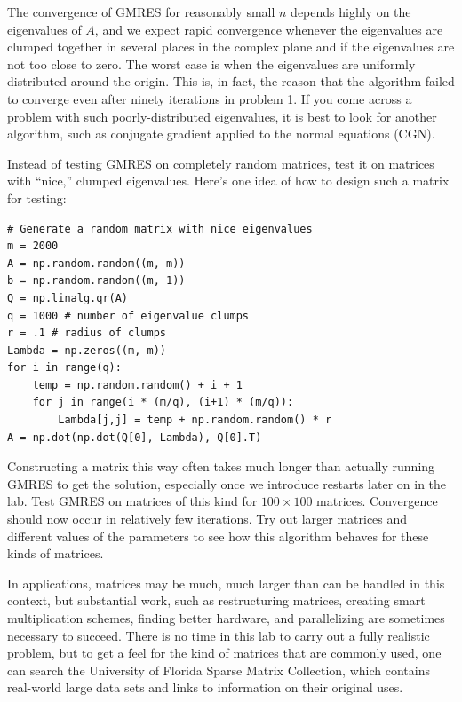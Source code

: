 The convergence of GMRES for reasonably small $n$ depends highly on the eigenvalues of $A$, and we expect rapid convergence whenever the eigenvalues are clumped together in several places in the complex plane and if the eigenvalues are not too close to zero.
The worst case is when the eigenvalues are uniformly distributed around the origin.
This is, in fact, the reason that the algorithm failed to converge even after ninety iterations in problem 1.
If you come across a problem with such poorly-distributed eigenvalues, it is best to look for another algorithm, such as conjugate gradient applied to the normal equations (CGN).

\begin{problem}
\label{prob:GMRESClumps}
Instead of testing GMRES on completely random matrices, test it on matrices with ``nice,'' clumped eigenvalues.
Here's one idea of how to design such a matrix for testing:
\begin{lstlisting}
# Generate a random matrix with nice eigenvalues
m = 2000
A = np.random.random((m, m))
b = np.random.random((m, 1))
Q = np.linalg.qr(A)
q = 1000 # number of eigenvalue clumps
r = .1 # radius of clumps
Lambda = np.zeros((m, m))
for i in range(q):
    temp = np.random.random() + i + 1
    for j in range(i * (m/q), (i+1) * (m/q)):
        Lambda[j,j] = temp + np.random.random() * r
A = np.dot(np.dot(Q[0], Lambda), Q[0].T)
\end{lstlisting}
Constructing a matrix this way often takes much longer than actually running GMRES to get the solution, especially once we introduce restarts later on in the lab.
Test GMRES on matrices of this kind for $100\times 100$ matrices.
Convergence should now occur in relatively few iterations.
Try out larger matrices and different values of the parameters to see how this algorithm behaves for these kinds of matrices.
\end{problem}

\begin{info}
In applications, matrices may be much, much larger than can be handled in this context, but substantial work, such as restructuring matrices, creating smart multiplication schemes, finding better hardware, and parallelizing are sometimes necessary to succeed.
There is no time in this lab to carry out a fully realistic problem, but to get a feel for the kind of matrices that are commonly used, one can search the University of Florida Sparse Matrix Collection, which contains real-world large data sets and links to information on their original uses.
\end{info}

